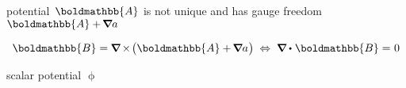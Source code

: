 potential~${\boldmathbb{A}}$ is not unique and has gauge freedom ${\boldmathbb{A} + \hspace{-0.2ex} \boldnabla a}$

\[
\boldmathbb{B} =  \hspace{-0.1ex} \boldnabla \hspace{-0.15ex} \times \hspace{-0.3ex} \bigl( \boldmathbb{A} + \hspace{-0.2ex} \boldnabla a \hspace{.1ex} \bigr)
\hspace{.25em} \Leftrightarrow \hspace{.27em}
\boldnabla \dotp \hspace{.12ex} \boldmathbb{B} = \hspace{.1ex} 0
\]

scalar potential $\upphi$

